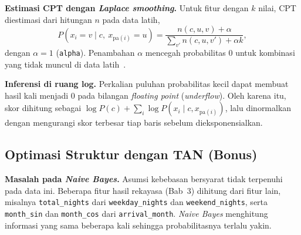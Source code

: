 \textbf{Estimasi CPT dengan \textit{Laplace smoothing}.} Untuk fitur dengan $k$
nilai, CPT diestimasi dari hitungan $n$ pada data latih,
\begin{equation}
	P(x_i=v\mid c,\ x_{\mathrm{pa}(i)}=u)=\frac{n(c,u,v)+\alpha}{\sum_{v'}n(c,u,v')+\alpha k},
\end{equation}
dengan $\alpha=1$ (\texttt{alpha}). Penambahan $\alpha$ mencegah probabilitas 0
untuk kombinasi yang tidak muncul di data latih~\cite{kkif2026bayesnet}.

\textbf{Inferensi di ruang log.} Perkalian puluhan probabilitas kecil dapat
membuat hasil kali menjadi 0 pada bilangan \textit{floating point}
(\textit{underflow}). Oleh karena itu, skor dihitung sebagai
$\log P(c)+\sum_i\log P(x_i\mid c,x_{\mathrm{pa}(i)})$, lalu dinormalkan dengan
mengurangi skor terbesar tiap baris sebelum dieksponensialkan.







\subsection{Optimasi Struktur dengan TAN (Bonus)}
\label{sec:tan}

\textbf{Masalah pada \textit{Naive Bayes}.} Asumsi kebebasan bersyarat tidak
terpenuhi pada data ini. Beberapa fitur hasil rekayasa (Bab~3) dihitung dari
fitur lain, misalnya \texttt{total\_nights} dari \texttt{weekday\_nights} dan
\texttt{weekend\_nights}, serta \texttt{month\_sin} dan \texttt{month\_cos} dari
\texttt{arrival\_month}. \textit{Naive Bayes} menghitung informasi yang sama
beberapa kali sehingga probabilitasnya terlalu yakin.

